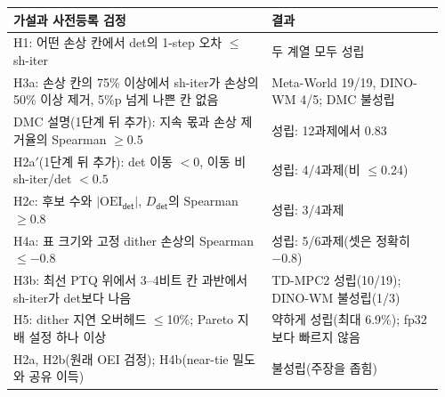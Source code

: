 \documentclass[nouppercase]{kaia}
\newcommand{\shiter}{\textsf{sh-iter}}
\newcommand{\dtm}{\textsf{det}}
\begin{document}
\begin{mdframed}
\begin{center}
\footnotesize
\setlength{\tabcolsep}{5pt}
\begin{tabular}{@{}p{0.58\linewidth}>{\raggedright\arraybackslash}p{0.38\linewidth}@{}}
\toprule
가설과 사전등록 검정 & 결과 \\
\midrule
H1: 어떤 손상 칸에서 \dtm{}의 1-step 오차 $\le$ \shiter{} & 두 계열 모두 성립 \\
H3a: 손상 칸의 75\% 이상에서 \shiter{}가 손상의 50\% 이상 제거, 5\%p 넘게 나쁜 칸 없음 & Meta-World 19/19, DINO-WM 4/5; DMC 불성립 \\
DMC 설명(1단계 뒤 추가): 지속 몫과 손상 제거율의 Spearman $\ge0.5$ & 성립: 12과제에서 0.83 \\
H2a$'$(1단계 뒤 추가): \dtm{} 이동 $<0$, 이동 비 \shiter/\dtm{} $<0.5$ & 성립: 4/4과제(비 $\le$0.24) \\
H2c: 후보 수와 $|\mathrm{OEI}_{\dtm}|$, $D_{\dtm}$의 Spearman $\ge0.8$ & 성립: 3/4과제 \\
H4a: 표 크기와 고정 dither 손상의 Spearman $\le-0.8$ & 성립: 5/6과제(셋은 정확히 $-0.8$) \\
H3b: 최선 PTQ 위에서 3--4비트 칸 과반에서 \shiter{}가 \dtm{}보다 나음 & TD-MPC2 성립(10/19); DINO-WM 불성립(1/3) \\
H5: dither 지연 오버헤드 $\le$10\%; Pareto 지배 설정 하나 이상 & 약하게 성립(최대 6.9\%); fp32보다 빠르지 않음 \\
H2a, H2b(원래 OEI 검정); H4b(near-tie 밀도와 공유 이득) & 불성립(주장을 좁힘) \\
\bottomrule
\end{tabular}
\label{tab:hyp}
\end{center}

\par\vspace{3pt}

\end{mdframed}
\end{document}
